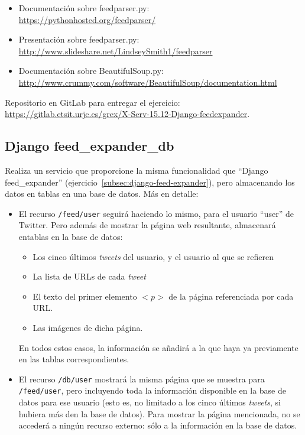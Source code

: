 \begin{itemize}
\item Documentación sobre feedparser.py: \\
  \url{https://pythonhosted.org/feedparser/}
\item Presentación sobre feedparser.py: \\
  \url{http://www.slideshare.net/LindseySmith1/feedparser}
\item Documentación sobre BeautifulSoup.py: \\
  \url{http://www.crummy.com/software/BeautifulSoup/documentation.html}
\end{itemize}


Repositorio en GitLab para entregar el ejercicio: \\ 
\url{https://gitlab.etsit.urjc.es/grex/X-Serv-15.12-Django-feedexpander}.


\subsection{Django feed\_expander\_db}
\label{subsec:django-feed-expander-db}

Realiza un servicio que proporcione la misma funcionalidad que ``Django feed\_expander'' (ejercicio~\ref{subsec:django-feed-expander}), pero almacenando los datos en tablas en una base de datos. Más en detalle:

\begin{itemize}
\item El recurso \verb|/feed/user| seguirá haciendo lo mismo, para el usuario ``user'' de Twitter. Pero además de mostrar la página web resultante, almacenará entablas en la base de datos:

  \begin{itemize}
  \item Los cinco últimos \emph{tweets} del usuario, y el usuario al que se refieren
  \item La lista de URLs de cada \emph{tweet}
  \item El texto del primer elemento $<p>$ de la página referenciada por cada URL.
  \item Las imágenes de dicha página.
  \end{itemize}

En todos estos casos, la información se añadirá a la que haya ya previamente en las tablas correspondientes.

\item El recurso \verb|/db/user| mostrará la misma página que se muestra para \verb|/feed/user|, pero incluyendo toda la información disponible en la base de datos para ese usuario (esto es, no limitado a los cinco últimos \emph{tweets}, si hubiera más den la base de datos). Para mostrar la página mencionada, no se accederá a ningún recurso externo: sólo a la información en la base de datos.
\end{itemize}

